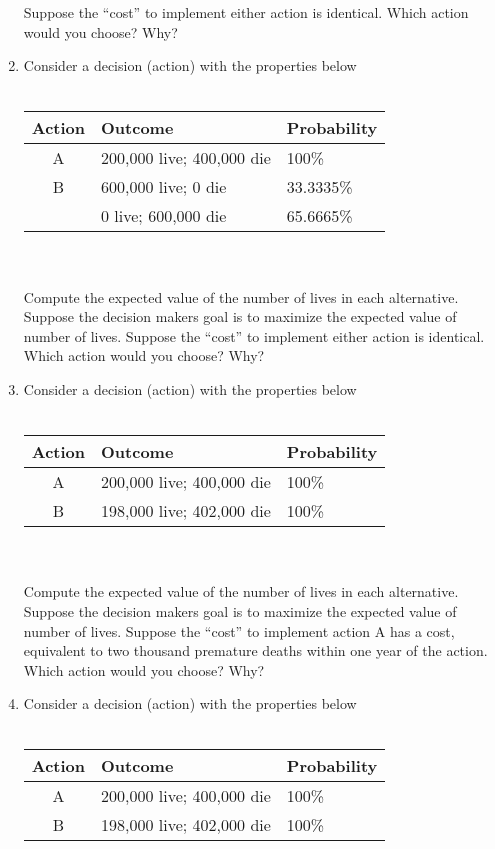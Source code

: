 \documentclass[12pt]{article}
\begin{document}
\begin{enumerate}
Suppose the ``cost'' to implement either action is identical.
Which action would you choose? Why?
\item Consider a decision (action) with the properties below \\ ~\\
\begin{tabular}{cll}
Action & Outcome & Probability \\
\hline
\hline
A & 200,000 live; 400,000 die & 100\% \\
B & 600,000 live; 0 die & 33.3335\% \\
~ & 0 live; 600,000 die & 65.6665\% \\
\end{tabular}\\~\\
Compute the expected value of the number of lives in each alternative.
Suppose the decision makers goal is to maximize the expected value of number of lives.
Suppose the ``cost'' to implement either action is identical.
Which action would you choose? Why?
\newpage
\item Consider a decision (action) with the properties below \\ ~\\
\begin{tabular}{cll}
Action & Outcome & Probability \\
\hline
\hline
A & 200,000 live; 400,000 die & 100\% \\
B & 198,000 live; 402,000 die & 100\% \\
\end{tabular}\\~\\
Compute the expected value of the number of lives in each alternative.
Suppose the decision makers goal is to maximize the expected value of number of lives.
Suppose the ``cost'' to implement action A has a cost, equivalent to two thousand premature deaths within one year of the action.
Which action would you choose? Why?
\item Consider a decision (action) with the properties below \\ ~\\
\begin{tabular}{cll}
Action & Outcome & Probability \\
\hline
\hline
A & 200,000 live; 400,000 die & 100\% \\
B & 198,000 live; 402,000 die & 100\% \\

\end{tabular}
\end{enumerate}
\end{document}
